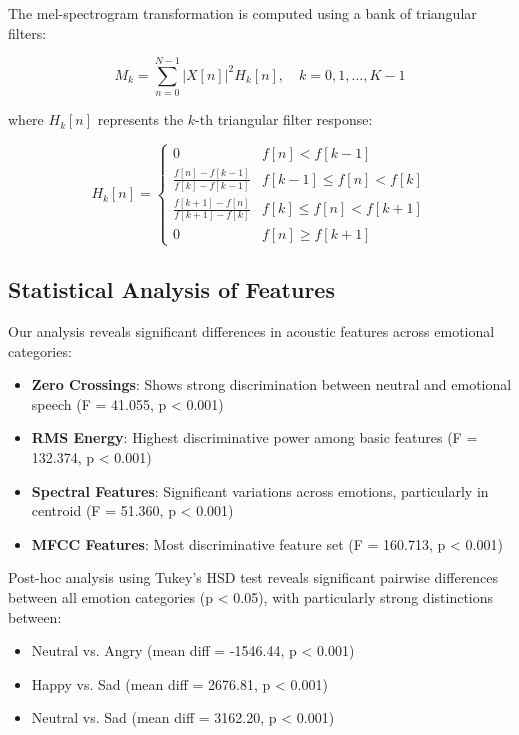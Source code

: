 \documentclass[12pt,a4paper]{article}
\begin{document}
The mel-spectrogram transformation is computed using a bank of triangular filters:

\begin{equation}
    M_k = \sum_{n=0}^{N-1} |X[n]|^2 H_k[n], \quad k = 0,1,\ldots,K-1
\end{equation}

where $H_k[n]$ represents the $k$-th triangular filter response:

\begin{equation}
    H_k[n] = \begin{cases}
        0 & f[n] < f[k-1] \\
        \frac{f[n]-f[k-1]}{f[k]-f[k-1]} & f[k-1] \leq f[n] < f[k] \\
        \frac{f[k+1]-f[n]}{f[k+1]-f[k]} & f[k] \leq f[n] < f[k+1] \\
        0 & f[n] \geq f[k+1]
    \end{cases}
\end{equation}

\subsection{Statistical Analysis of Features}
Our analysis reveals significant differences in acoustic features across emotional categories:

\begin{itemize}
    \item \textbf{Zero Crossings}: Shows strong discrimination between neutral and emotional speech (F = 41.055, p < 0.001)
    \item \textbf{RMS Energy}: Highest discriminative power among basic features (F = 132.374, p < 0.001)
    \item \textbf{Spectral Features}: Significant variations across emotions, particularly in centroid (F = 51.360, p < 0.001)
    \item \textbf{MFCC Features}: Most discriminative feature set (F = 160.713, p < 0.001)
\end{itemize}

Post-hoc analysis using Tukey's HSD test reveals significant pairwise differences between all emotion categories (p < 0.05), with particularly strong distinctions between:
\begin{itemize}
    \item Neutral vs. Angry (mean diff = -1546.44, p < 0.001)
    \item Happy vs. Sad (mean diff = 2676.81, p < 0.001)
    \item Neutral vs. Sad (mean diff = 3162.20, p < 0.001)
\end{itemize}
\end{document}
